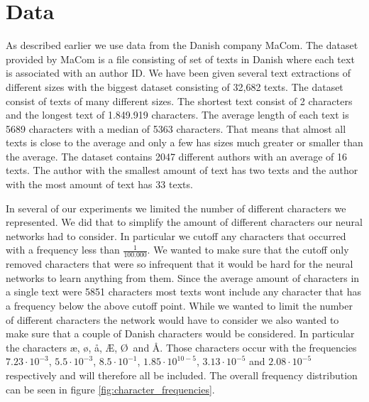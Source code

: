 \section{Data} \label{sec:data}

As described earlier we use data from the Danish company MaCom. The dataset
provided by MaCom is a file consisting of set of texts in Danish where each text
is associated with an author ID. We have been given several text extractions
of different sizes with the biggest dataset consisting of 32,682 texts. The
dataset consist of texts of many different sizes. The shortest text consist of 2
characters and the longest text of 1.849.919 characters. The average length of
each text is 5689 characters with a median of 5363 characters. That means that
almost all texts is close to the average and only a few has sizes much greater
or smaller than the average. The dataset contains 2047 different authors with
an average of 16 texts. The author with the smallest amount of text has two
texts and the author with the most amount of text has 33 texts.

In several of our experiments we limited the number of different characters
we represented. We did that to simplify the amount of different characters
our neural networks had to consider. In particular we cutoff any characters
that occurred with a frequency less than $\frac{1}{100.000}$. We wanted to
make sure that the cutoff only removed characters that were so infrequent
that it would be hard for the neural networks to learn anything from them.
Since the average amount of characters in a single text were 5851 characters
most texts wont include any character that has a frequency below the above
cutoff point. While we wanted to limit the number of different characters
the network would have to consider we also wanted to make sure that a couple
of Danish characters would be considered. In particular the characters \ae,
\o, \aa, \AE, \O\ and \AA. Those characters occur with the frequencies
$7.23\cdot10^{-3}$, $5.5\cdot10^{-3}$, $8.5\cdot10^{-1}$, $1.85\cdot10^{10-5}$,
$3.13\cdot10^{-5}$ and $2.08\cdot10^{-5}$ respectively and will therefore
all be included. The overall frequency distribution can be seen in figure
\ref{fig:character_frequencies}.

